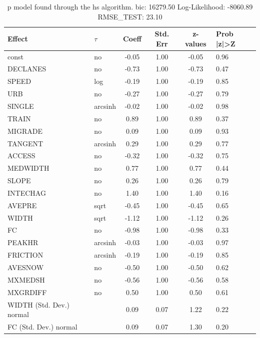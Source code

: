 \begin{table}
	\caption{p model found through the hs algorithm. bic: 16279.50 Log-Likelihood: -8060.89 RMSE_TEST: 23.10}
	\begin{center}
		\begin{tabular}{|l|l|c|c|c|l|}
			\hline
			Effect & $\tau$ & Coeff & Std. Err & z-values & Prob |z|>Z \\
			\hline
			const & no & -0.05 & 1.00 & -0.05 & 0.96 \\
			\hline
			DECLANES & no & -0.73 & 1.00 & -0.73 & 0.47 \\
			\hline
			SPEED & log & -0.19 & 1.00 & -0.19 & 0.85 \\
			\hline
			URB & no & -0.27 & 1.00 & -0.27 & 0.79 \\
			\hline
			SINGLE & arcsinh & -0.02 & 1.00 & -0.02 & 0.98 \\
			\hline
			TRAIN & no & 0.89 & 1.00 & 0.89 & 0.37 \\
			\hline
			MIGRADE & no & 0.09 & 1.00 & 0.09 & 0.93 \\
			\hline
			TANGENT & arcsinh & 0.29 & 1.00 & 0.29 & 0.77 \\
			\hline
			ACCESS & no & -0.32 & 1.00 & -0.32 & 0.75 \\
			\hline
			MEDWIDTH & no & 0.77 & 1.00 & 0.77 & 0.44 \\
			\hline
			SLOPE & no & 0.26 & 1.00 & 0.26 & 0.79 \\
			\hline
			INTECHAG & no & 1.40 & 1.00 & 1.40 & 0.16 \\
			\hline
			AVEPRE & sqrt & -0.45 & 1.00 & -0.45 & 0.65 \\
			\hline
			WIDTH & sqrt & -1.12 & 1.00 & -1.12 & 0.26 \\
			\hline
			FC & no & -0.98 & 1.00 & -0.98 & 0.33 \\
			\hline
			PEAKHR & arcsinh & -0.03 & 1.00 & -0.03 & 0.97 \\
			\hline
			FRICTION & arcsinh & -0.19 & 1.00 & -0.19 & 0.85 \\
			\hline
			AVESNOW & no & -0.50 & 1.00 & -0.50 & 0.62 \\
			\hline
			MXMEDSH & no & -0.56 & 1.00 & -0.56 & 0.58 \\
			\hline
			MXGRDIFF & no & 0.50 & 1.00 & 0.50 & 0.61 \\
			\hline
			WIDTH (Std. Dev.) normal &  & 0.09 & 0.07 & 1.22 & 0.22 \\
			\hline
			FC (Std. Dev.) normal &  & 0.09 & 0.07 & 1.30 & 0.20 \\
			\hline

\end{tabular}
\end{center}
\end{table}
